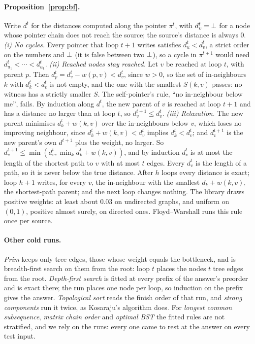 \paragraph{Proposition~\ref{prop:bf}.} Write $d^t$ for the distances computed along the pointer $\pi^t$, with $d^t_v =
\bot$ for a node whose pointer chain does not reach the source; the source's distance is always $0$. \emph{(i) No
cycles.} Every pointer that loop $t+1$ writes satisfies $d^t_u < d^t_v$, a strict order on the numbers and $\bot$ (it
is false between two $\bot$), so a cycle in $\pi^{t+1}$ would need $d^t_{u_1} < \cdots < d^t_{u_1}$. \emph{(ii)
Reached nodes stay reached.} Let $v$ be reached at loop $t$, with parent $p$. Then $d^t_p = d^t_v - w(p,v) < d^t_v$,
since $w > 0$, so the set of in-neighbours $k$ with $d^t_k < d^t_v$ is not empty, and the one with the smallest
$S(k,v)$ passes: no witness has a strictly smaller $S$. The self-pointer's rule, ``no in-neighbour below me'', fails. By
induction along $d^t$, the new parent of $v$ is reached at loop $t+1$ and has a distance no larger than at loop $t$, so
$d^{t+1}_v \leq d^{t}_v$. \emph{(iii) Relaxation.} The new parent minimises $d^t_k + w(k,v)$ over the in-neighbours
below $v$, which loses no improving neighbour, since $d^t_k + w(k,v) < d^t_v$ implies $d^t_k < d^t_v$; and $d^{t+1}_v$
is the new parent's own $d^{t+1}$ plus the weight, no larger. So $d^{t+1}_v \leq \min(d^t_v, \min_k d^t_k + w(k,v))$,
and by induction $d^t_v$ is at most the length of the shortest path to $v$ with at most $t$ edges. Every $d^t_v$ is the
length of a path, so it is never below the true distance. After $h$ loops every distance is exact; loop $h+1$ writes, for
every $v$, the in-neighbour with the smallest $d_k + w(k,v)$, the shortest-path parent; and the next loop changes
nothing. The library draws positive weights: at least about $0.03$ on undirected graphs, and uniform on $(0,1)$, positive
almost surely, on directed ones. Floyd--Warshall runs this rule once per source.

\paragraph{Other cold runs.} \emph{Prim} keeps only tree edges, those whose weight equals the bottleneck, and is
breadth-first search on them from the root: loop $t$ places the nodes $t$ tree edges from the root. \emph{Depth-first
search} is fitted at every prefix of the answer's preorder and is exact there; the run places one node per loop, so
induction on the prefix gives the answer. \emph{Topological sort} reads the finish order of that run, and \emph{strong
components} run it twice, as Kosaraju's algorithm does. For \emph{longest common subsequence}, \emph{matrix chain order}
and \emph{optimal BST} the fitted rules are not stratified, and we rely on the runs: every one came to rest at the
answer on every test input.

